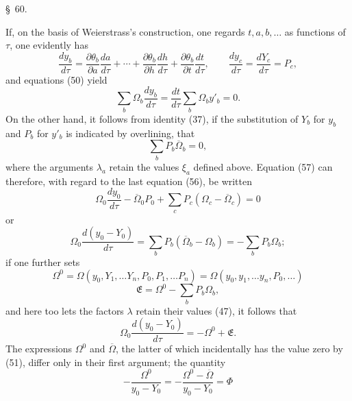 \documentclass[11pt,a4paper,leqno]{article}
\begin{document}

\begin{center}
{\large \S~60.}
\end{center}

If, on the basis of Weierstrass's construction, one regards
$t,a,b,\ldots$ as functions of $\tau$, one evidently has
\begin{equation}\tag{56}
\frac{dy_b}{d\tau}
=\frac{\partial\theta_b}{\partial a}\frac{da}{d\tau}
+\cdots+
\frac{\partial\theta_b}{\partial h}\frac{dh}{d\tau}
+\frac{\partial\theta_b}{\partial t}\frac{dt}{d\tau},\qquad
\frac{dy_c}{d\tau}=\frac{dY_c}{d\tau}=P_c,
\end{equation}
and equations (50) yield
\begin{equation}\tag{57}
\sum_b\Omega_b\frac{dy_b}{d\tau}
=\frac{dt}{d\tau}\sum_b\Omega_b y'_b=0.
\end{equation}
On the other hand, it follows from identity (37), if the substitution
of $Y_b$ for $y_b$ and $P_b$ for $y'_b$ is indicated by overlining,
that
\[
\sum_b P_b\overline{\Omega}_b=0,
\]
where the arguments $\lambda_a$ retain the values $\xi_a$ defined
above. Equation (57) can therefore, with regard to the last equation
(56), be written
\[
\Omega_0\frac{dy_0}{d\tau}-\overline{\Omega}_0P_0
+\sum_c P_c(\Omega_c-\overline{\Omega}_c)=0
\]
or
\[
\Omega_0\frac{d(y_0-Y_0)}{d\tau}
=\sum_b P_b(\overline{\Omega}_b-\Omega_b)
=-\sum_b P_b\Omega_b;
\]
if one further sets
\[
\Omega^0=\Omega(y_0,Y_1,\ldots Y_n,P_0,P_1,\ldots P_n)
=\Omega(y_0,y_1,\ldots y_n,P_0,\ldots)
\]
\[
\mathfrak{E}=\Omega^0-\sum_b P_b\Omega_b,
\]
and here too lets the factors $\lambda$ retain their values (47), it
follows that
\begin{equation}\tag{58}
\Omega_0\frac{d(y_0-Y_0)}{d\tau}=-\Omega^0+\mathfrak{E}.
\end{equation}
The expressions $\Omega^0$ and $\overline{\Omega}$, the latter of which
incidentally has the value zero by (51), differ only in their first
argument; the quantity
\[
-\frac{\Omega^0}{y_0-Y_0}
=-\frac{\Omega^0-\overline{\Omega}}{y_0-Y_0}=\Phi
\]
\end{document}
